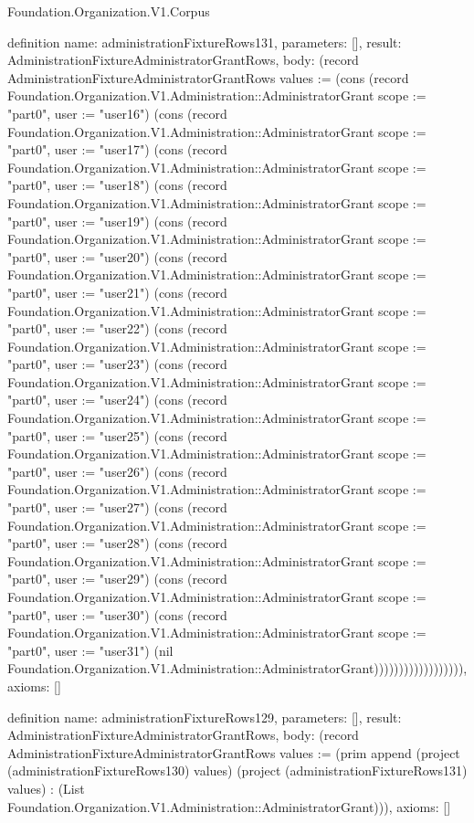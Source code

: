 \begin{lexlean}{Foundation.Organization.V1.Corpus}
\begin{semanticmodule}
definition{
  name: administrationFixtureRows131,
  parameters: [],
  result: AdministrationFixtureAdministratorGrantRows,
  body: (record AdministrationFixtureAdministratorGrantRows {values := (cons (record Foundation.Organization.V1.Administration::AdministratorGrant {scope := "part0", user := "user16"}) (cons (record Foundation.Organization.V1.Administration::AdministratorGrant {scope := "part0", user := "user17"}) (cons (record Foundation.Organization.V1.Administration::AdministratorGrant {scope := "part0", user := "user18"}) (cons (record Foundation.Organization.V1.Administration::AdministratorGrant {scope := "part0", user := "user19"}) (cons (record Foundation.Organization.V1.Administration::AdministratorGrant {scope := "part0", user := "user20"}) (cons (record Foundation.Organization.V1.Administration::AdministratorGrant {scope := "part0", user := "user21"}) (cons (record Foundation.Organization.V1.Administration::AdministratorGrant {scope := "part0", user := "user22"}) (cons (record Foundation.Organization.V1.Administration::AdministratorGrant {scope := "part0", user := "user23"}) (cons (record Foundation.Organization.V1.Administration::AdministratorGrant {scope := "part0", user := "user24"}) (cons (record Foundation.Organization.V1.Administration::AdministratorGrant {scope := "part0", user := "user25"}) (cons (record Foundation.Organization.V1.Administration::AdministratorGrant {scope := "part0", user := "user26"}) (cons (record Foundation.Organization.V1.Administration::AdministratorGrant {scope := "part0", user := "user27"}) (cons (record Foundation.Organization.V1.Administration::AdministratorGrant {scope := "part0", user := "user28"}) (cons (record Foundation.Organization.V1.Administration::AdministratorGrant {scope := "part0", user := "user29"}) (cons (record Foundation.Organization.V1.Administration::AdministratorGrant {scope := "part0", user := "user30"}) (cons (record Foundation.Organization.V1.Administration::AdministratorGrant {scope := "part0", user := "user31"}) (nil Foundation.Organization.V1.Administration::AdministratorGrant)))))))))))))))))}),
  axioms: []
}

definition{
  name: administrationFixtureRows129,
  parameters: [],
  result: AdministrationFixtureAdministratorGrantRows,
  body: (record AdministrationFixtureAdministratorGrantRows {values := (prim append (project (administrationFixtureRows130) values) (project (administrationFixtureRows131) values) : (List Foundation.Organization.V1.Administration::AdministratorGrant))}),
  axioms: []
}


\end{semanticmodule}
\end{lexlean}
